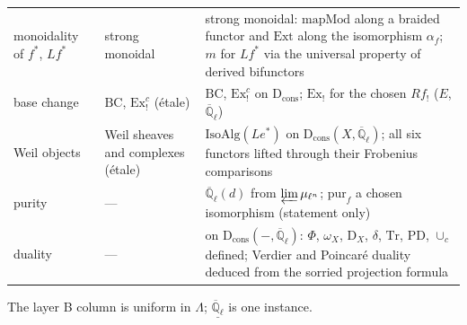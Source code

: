 \documentclass[11pt]{article}
\theoremstyle{remark}
\newcommand{\D}{\mathrm{D}}
\newcommand{\Ext}{\mathrm{Ext}}
\newcommand{\Qlbar}{\overline{\mathbb{Q}}_\ell}
\newcommand{\Dc}{\D_{\mathrm{cons}}}
\begin{document}
\begin{tabularx}{\textwidth}{@{}lXX@{}}
monoidality of $f^*$, $Lf^*$ & strong monoidal & strong monoidal: $\mathrm{mapMod}$ along a
  braided functor and $\Ext$ along the isomorphism $\alpha_f$; $m$ for $Lf^*$ via the universal
  property of derived bifunctors\\
base change & $\mathrm{BC}$, $\mathrm{Ex}_!^c$ (\'etale) & $\mathrm{BC}$,
  $\mathrm{Ex}_!^c$ on $\Dc$; $\mathrm{Ex}_!$ for the chosen $Rf_!$ ($E$, $\Qlbar$)\\
Weil objects & Weil sheaves and complexes (\'etale) & $\mathrm{IsoAlg}(Le^*)$ on
  $\Dc(X,\Qlbar)$; all six functors lifted through their Frobenius comparisons\\
purity & --- & $\Qlbar(d)$ from $\varprojlim\mu_{\ell^n}$; $\mathrm{pur}_f$ a chosen isomorphism
  (statement only)\\
duality & --- & on $\Dc(-,\Qlbar)$: $\Phi$, $\omega_X$, $\D_X$, $\delta$, $\mathrm{Tr}$,
  $\mathrm{PD}$, $\cup_c$ defined; Verdier and Poincar\'e duality deduced from the sorried
  projection formula\\
\bottomrule
\end{tabularx}
\medskip

The layer B column is uniform in $\Lambda$; $\underline{\Qlbar}$ is one instance.
\end{document}
